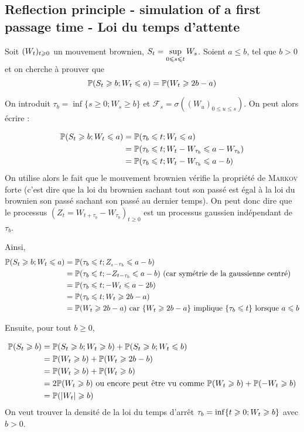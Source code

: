 \subsection{Reflection principle - simulation of a first passage time - Loi du temps d'attente}
\newcommand{\st}{S_t}
Soit $(W_t)_{t \geqslant 0}$ un mouvement brownien, $\displaystyle S_t = \sup_{0 \leqslant s \leqslant t} W_s$. Soient $a \leq b$, tel que $b>0$ et on cherche à prouver que 
\[ \P(\st \geq b; \wt \leq a) = \P(\wt \geq 2b-a) \]

\newcommand{\fs}{\mathcal{F}_s}
On introduit $\tau_b = \inf\{s \geq 0; W_s \geq b\}$ et $\fs = \sigma((W_u)_{0 \leq u \leq s})$. On peut alors écrire :

\newcommand{\wtb}{W_{\tau_b}}
\begin{equation*}
\begin{split}
  \P(\st \geq b; \wt \leq a) &= \P(\tau_b \leq t; \wt \leq a) \\
  &= \P(\tau_b \leq t; \wt - \wtb \leq a - \wtb) \\
  &= \P(\tau_b \leq t; \wt - \wtb \leq a-b) 
\end{split}
\end{equation*}
On utilise alors le fait que le mouvement brownien vérifie la propriété de \textsc{Markov} forte (c'est dire que la loi du brownien sachant tout son passé est égal à la loi du brownien son passé sachant son passé au dernier temps). On peut donc dire que le processus $(Z_t = W_{t+\tau_b} - \wtb)_{t \geq 0}$ est un processus gaussien indépendant de $\tau_b$.

Ainsi,
\begin{equation*}
\begin{split}
  \P(\st \geq b; \wt \leq a) &= \P(\tau_b \leq t ; Z_{_t-\tau_b} \leq a-b) \\
  &= \P(\tau_b \leq t; - Z_{t- \tau_b} \leq a-b) \text{ (car symétrie de la gaussienne centré)} \\
  &= \P(\tau_b \leq t; - \wt \leq a - 2b) \\
  &= \P(\tau_b \leq t; \wt \geq 2b-a)  \\
  &= \P(\wt \geq 2b-a) \text{ car } \{ \wt \geq 2b-a \} \text{ implique } \{ \tau_b \leq t \} \text{ lorsque } a \leq b
\end{split}
\end{equation*}

Ensuite, pour tout $b\geq 0$, 

\begin{equation*}
\begin{split}
  \P(\st \geq b) &= \P(\st \geq b; \wt \geq b) + \P(\st \geq b; \wt \leq b) \\
  &= \P(\wt \geq b) + \P(\wt \geq 2b-b) \\
  &= \P(\wt \geq b) + \P(\wt \geq b) \\
  &= 2\P(\wt \geq b) \text{ ou encore peut être vu comme }  \P(\wt \geq b) + \P(-\wt \geq b) \\
  &= \P(\vert \wt \vert \geq b)
\end{split}
\end{equation*}
On veut trouver la densité de la loi du temps d'arrêt $\tau_b = \inf \{ t \geqslant 0; W_t \geqslant b \}$ avec $b > 0$. 

